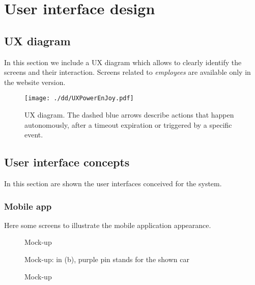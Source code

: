 \documentclass{scrreprt}
\begin{document}
\chapter{User interface design}

\section{UX diagram}
In this section we include a UX diagram which allows to clearly identify the screens and their interaction. Screens related to \emph{employees} are available only in the website version.
\begin{figure}[htb]
\centering
		\texttt{[image: ./dd/UXPowerEnJoy.pdf]}
		\caption{UX diagram. The dashed blue arrows describe actions that happen autonomously, after a timeout expiration or triggered by a specific event.}
		\label{UX}
\end{figure}

\section{User interface concepts}
In this section are shown the user interfaces conceived for the system.

\subsection{Mobile app}
Here some screens to illustrate the mobile application appearance.

\begin{figure}[htb]
\centering
{} \quad
{}
\caption{Mock-up }
\label{fig:reglogMU}
\end{figure}


\begin{figure}[htb]
\centering
{} \quad
{}
\caption{Mock-up: in (b), purple pin stands for the shown car}
\label{fig:searchCarMU}
\end{figure}

\begin{figure}[htb]
\centering
{} \quad
{}
\caption{Mock-up }
\label{fig:chresMU}
\end{figure}
\end{document}
